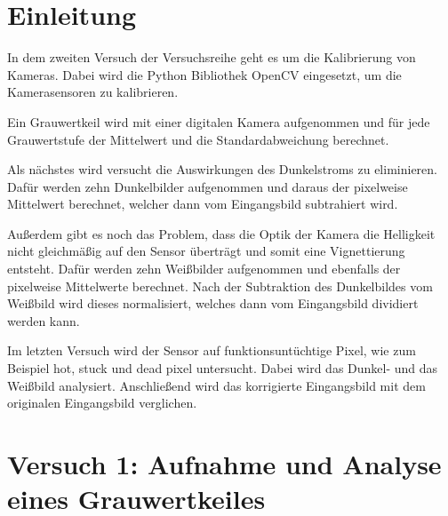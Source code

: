 \documentclass[12pt, oneside, a4paper, \docLanguage]{report}
\begin{document}

\setcounter{section}{0}



\clearpage

%
%


%
%


%
%


%
%




\setcounter{page}{1}
\pagestyle{default}
%
%
\chapter{Einleitung}
\label{chap:EINL}
In dem zweiten Versuch der Versuchsreihe geht es um die Kalibrierung von Kameras.
Dabei wird die Python Bibliothek OpenCV eingesetzt, um die Kamerasensoren zu kalibrieren.

Ein Grauwertkeil wird mit einer digitalen Kamera aufgenommen und für jede Grauwertstufe der Mittelwert und die Standardabweichung berechnet.

Als nächstes wird versucht die Auswirkungen des Dunkelstroms zu eliminieren. Dafür werden zehn Dunkelbilder aufgenommen und daraus der pixelweise Mittelwert berechnet, welcher dann vom Eingangsbild subtrahiert wird. 

Außerdem gibt es noch das Problem, dass die Optik der Kamera die Helligkeit nicht gleichmäßig auf den Sensor überträgt und somit eine Vignettierung entsteht. Dafür werden zehn Weißbilder aufgenommen und ebenfalls der pixelweise Mittelwerte berechnet. Nach der Subtraktion des Dunkelbildes vom Weißbild wird dieses normalisiert, welches dann vom Eingangsbild dividiert werden kann. 

Im letzten Versuch wird der Sensor auf funktionsuntüchtige Pixel, wie zum Beispiel hot, stuck und dead pixel untersucht. Dabei wird das Dunkel- und das Weißbild analysiert. Anschließend wird das korrigierte Eingangsbild mit dem originalen Eingangsbild verglichen. 

%
%
\chapter{Versuch 1: Aufnahme und Analyse eines Grauwertkeiles}
\label{chap:VERSUCH_1}
\end{document}
